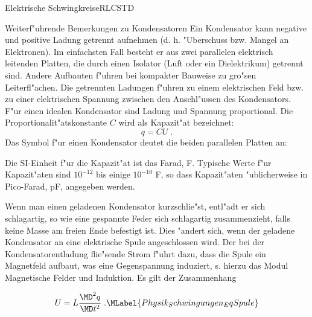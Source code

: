 \begin{MXContent}{Elektrische Schwingkreise}{RLC}{STD}
  \begin{MHint}{Weiterf"uhrende Bemerkungen zu Kondensatoren}
  Ein Kondensator kann negative und positive Ladung getrennt aufnehmen (d. h. "Uberschuss bzw. Mangel an Elektronen). Im einfachsten Fall besteht er aus zwei parallelen elektrisch leitenden Platten, die durch einen Isolator (Luft oder ein Dielektrikum) getrennt sind. Andere Aufbauten f"uhren bei kompakter Bauweise zu gro"sen Leiterfl"achen. Die getrennten Ladungen f"uhren zu einem elektrischen Feld bzw. zu einer elektrischen Spannung zwischen den Anschl"ussen des Kondensators. F"ur einen idealen Kondensator sind Ladung und Spannung proportional. Die Proportionalit"atskonstante $C$ wird als Kapazit"at bezeichnet:
  $$
  q = C U\; .
  $$
  Das Symbol f"ur einen Kondensator deutet die beiden parallelen Platten an:
  \begin{center}
  \end{center}
  Die SI-Einheit f"ur die Kapazit"at ist das Farad, F. Typische Werte f"ur Kapazit"aten sind $10^{-12}$ bis einige $10^{-10}$ F, so dass Kapazit"aten "ublicherweise in Pico-Farad, pF, angegeben werden.

  \end{MHint}


Wenn man einen geladenen Kondensator kurzschlie"st, entl"adt er sich schlagartig, so wie eine gespannte Feder sich schlagartig zusammenzieht, falls keine Masse am freien Ende befestigt ist. Dies "andert sich, wenn der geladene Kondensator an eine elektrische Spule angeschlossen wird. Der bei der Kondensatorentladung flie"sende Strom f"uhrt dazu, dass die Spule ein Magnetfeld aufbaut, was eine Gegenspannung induziert, s. hierzu das Modul \glqq Magnetische Felder und Induktion\grqq. Es gilt der Zusammenhang

\begin{equation}
  U = L \frac{\MD^2q }{\MD t^2}\; .\MLabel{Physik_Schwingungen_EqSpule}
\end{equation}


\end{MXContent}
